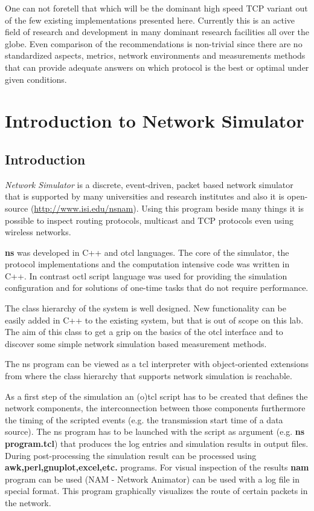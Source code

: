 \documentclass[a4paper]{article}
\begin{document}
One can not foretell that which will be the dominant high speed TCP variant out of the few existing implementations
presented here. Currently this is an active field of research and development in many dominant research facilities all
over the globe. Even comparison of the recommendations is non-trivial since there are no standardized aspects, metrics,
network environments and measurements methods that can provide adequate answers on which protocol is the best or
optimal under given conditions.

\section{Introduction to Network Simulator}

\subsection{Introduction}

\emph{Network Simulator} is a discrete, event-driven, packet based network simulator that is supported by many
universities and research institutes and also it is open-source (\url{http://www.isi.edu/nsnam}). Using this program
beside many things it is possible to inspect routing protocols, multicast and TCP protocols even using wireless
networks.

\textbf{ns} was developed in C++ and otcl languages. The core of the simulator, the protocol implementations and the
computation intensive code was written in C++. In contrast octl script language was used for providing the simulation
configuration and for solutions of one-time tasks that do not require performance.

The class hierarchy of the system is well designed. New functionality can be easily added in C++ to the existing
system, but that is out of scope on this lab. The aim of this class to get a grip on the basics of the otcl interface
and to discover some simple network simulation based measurement methods.

The ns program can be viewed as a tcl interpreter with object-oriented extensions from where the class hierarchy that
supports network simulation is reachable.

As a first step of the simulation an (o)tcl script has to be created that defines the network components, the
interconnection between those components furthermore the timing of the scripted events (e.g. the transmission start
time of a data source). The ns program has to be launched with the script as argument (e.g. \textbf{ns program.tcl})
that produces the log entries and simulation results in output files. During post-processing the simulation result can
be processed using \textbf{awk,perl,gnuplot,excel,etc.} programs. For visual inspection of the results \textbf{nam}
program can be used (NAM - Network Animator) can be used with a log file in special format. This program graphically
visualizes the route of certain packets in the network.
\end{document}

